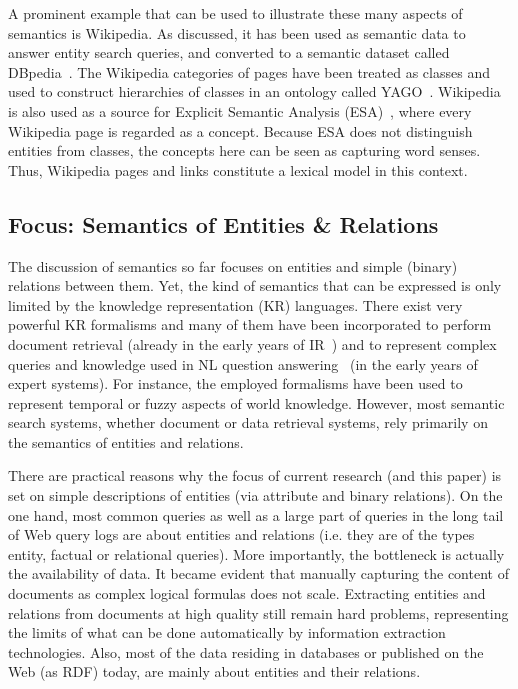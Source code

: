 A prominent example that can be used to illustrate these many aspects of semantics is Wikipedia. As discussed, it has been used as semantic data to answer entity search queries, and converted to a semantic dataset called DBpedia~\cite{DBLP:journals/ws/BizerLKABCH09}. The Wikipedia categories of pages have been treated as classes and used to construct hierarchies of classes in an ontology called YAGO~\cite{DBLP:conf/www/SuchanekKW07}. Wikipedia is also used as a source for Explicit Semantic Analysis (ESA)~\cite{DBLP:journals/tois/EgoziMG11}, where every Wikipedia page is regarded as a concept. Because ESA does not distinguish entities from classes, the concepts here can be seen as capturing word senses. Thus, Wikipedia pages and links constitute a lexical model in this context. 

\subsection{Focus: Semantics of Entities \& Relations} 

The discussion of semantics so far focuses on entities and simple (binary) relations between them. Yet, the kind of semantics that can be expressed is only limited by the knowledge representation (KR) languages. There exist very powerful KR formalisms and many of them have been incorporated to perform document retrieval (already in the early years of IR~\cite{DBLP:conf/sigir/Rijsbergen89}) and to represent complex queries and knowledge used in NL question answering~\cite{DBLP:journals/tkde/VassiliadisTK94} (in the early years of expert systems). For instance, the employed formalisms have been used to represent temporal or fuzzy aspects of world knowledge. However, most semantic search systems, whether document or data retrieval systems, rely primarily on the semantics of entities and relations. 

There are practical reasons why the focus of current research (and this paper) is set on simple descriptions of entities (via attribute and binary relations). On the one hand, 
most common queries as well as a large part of queries in the long tail of Web query logs 
are about entities and relations (i.e. they are of the types entity, factual or relational queries). More importantly, the bottleneck is actually the availability of data. It became evident that manually capturing the content of documents as complex logical formulas does not scale. Extracting entities and relations from documents at high quality still remain hard problems, representing the limits of what can be done automatically by information extraction technologies. Also, most of the data residing in databases or published on the Web (as RDF) today, are mainly about entities and their relations. 

